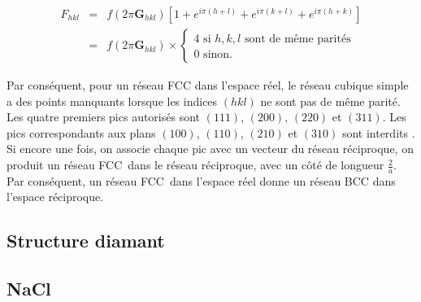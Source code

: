 \begin{eqnarray}
    F_{hkl} & = & f(2\pi \mathbf{G}_{hkl}) [ 1 + e^{i\pi(h+l)} + e^{i\pi(k+l)} + e^{i\pi(h+k)}]\\
    & = & f(2\pi\mathbf{G}_{hkl}) \times \begin{cases} 4 \text{ si } h,k,l \text{ sont de même parités}\\
    0\text{ sinon.} \end{cases}
\end{eqnarray}

Par conséquent, pour un réseau FCC dans l'espace réel, le réseau cubique simple a
des points manquants lorsque les indices $(hkl)$ ne sont pas de même parité. Les
quatre premiers pics autorisés sont $(111)$, $(200)$, $(220)$ et $(311)$. Les
pics correspondants aux plans $(100)$, $(110)$, $(210)$ et $(310)$ sont interdits
. Si encore une fois, on associe chaque pic avec un vecteur du réseau réciproque,
on produit un réseau FCC dans le réseau réciproque, avec un côté de longueur
$\frac{2}{a}$. Par conséquent, un réseau FCC dans l'espace réel donne un réseau
BCC dans l'espace réciproque.



\subsection{Structure diamant}
\subsection{NaCl}
